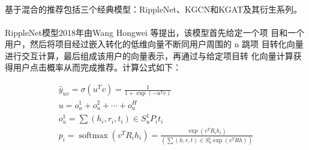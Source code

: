 \documentclass{article}
\newcommand{\upcite}[1]{\textsuperscript{\textsuperscript{\cite{#1}}}}
\begin{document}
	基于混合的推荐包括三个经典模型：RippleNet\upcite{12}、KGCN\upcite{13}和KGAT\upcite{14}及其衍生系列。
	
	RippleNet模型2018年由Wang Hongwei 等\upcite{12}提出，该模型首先给定一个项
	目和一个用户，然后将项目经过嵌入转化的低维向量不断同用户周围的 n 跳项
	目转化向量进行交互计算，最后组成该用户的向量表示，再通过与给定项目转
	化向量计算获得用户点击概率从而完成推荐。计算公式如下：

	\begin{equation}
	\begin{array}{l}
	\hat{y}_{u v}=\sigma\left(u^{T} v\right)=\frac{1}{1+\exp \left(-u^{T} v\right)} \\
	u=o_{u}^{1}+o_{u}^{2}+\cdots+o_{u}^{H} \\
	o_{u}^{1}=\sum\left(h_{i}, r_{i}, t_{i}\right) \in S_{u}^{1} P_{i} t_{i} \\
	p_{i}=\operatorname{softmax}\left(v^{T} R_{i} h_{i}\right)=\frac{\exp \left(v^{T} R_{i} h_{i}\right)}{\left(\sum(h, r, t) \in S_{u}^{1} \exp \left(v^{T} R h\right)\right)}
	\end{array}
	\end{equation}
	
\end{document}
